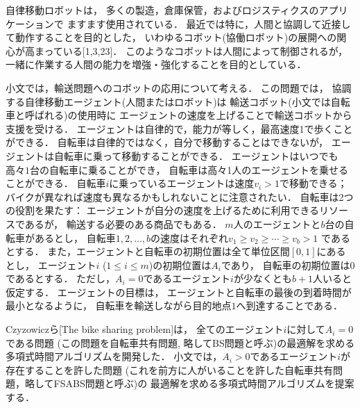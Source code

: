
自律移動ロボットは，
多くの製造，倉庫保管，およびロジスティクスのアプリケーションで
ますます使用されている．
最近では特に，人間と協調して近接して動作することを目的とした，
いわゆるコボット(協働ロボット)の展開への関心が高まっている[1,3,23]．
このようなコボットは人間によって制御されるが，
一緒に作業する人間の能力を増強・強化することを目的としている．

小文では，輸送問題へのコボットの応用について考える．
この問題では，
協調する自律移動エージェント(人間またはロボット)は
輸送コボット(小文では自転車と呼ばれる)の使用時に
エージェントの速度を上げることで輸送コボットから支援を受ける．
エージェントは自律的で，能力が等しく，最高速度1で歩くことができる．
自転車は自律的ではなく，自分で移動することはできないが，
エージェントは自転車に乗って移動することができる．
エージェントはいつでも高々$1$台の自転車に乗ることができ，
自転車は高々1人のエージェントを乗せることができる．
自転車$i$に乗っているエージェントは速度$v_i>1$で移動できる；
バイクが異なれば速度も異なるかもしれないことに注意されたい．
自転車は2つの役割を果たす：
エージェントが自分の速度を上げるために利用できるリソースであるが，
輸送する必要のある商品でもある．
$m$人のエージェントと$b$台の自転車があるとし，
自転車$1,2,\ldots,b$の速度はそれぞれ$v_1\ge v_2\ge\cdots\ge v_b>1$
であるとする．
また，エージェントと自転車の初期位置は全て単位区間$[0,1]$にあるとし，
エージェント$i$ ($1\le i\le m$)の初期位置は$A_i$であり，
自転車の初期位置は$0$であるとする．
ただし，$A_i=0$であるエージェント$i$が少なくとも$b+1$人いると仮定する．
エージェントの目標は，
エージェントと自転車の最後の到着時間が最小となるように，
自転車を輸送しながら目的地点$1$へ到達することである．

Czyzowiczら[The bike sharing problem]は，
全てのエージェント$i$に対して$A_i=0$である問題
(この問題を自転車共有問題, 略してBS問題と呼ぶ)の最適解を求める
多項式時間アルゴリズムを開発した．
小文では，$A_i>0$であるエージェント$i$が存在することを許した問題
(これを前方に人がいることを許した自転車共有問題，略してFSABS問題と呼ぶ)の
最適解を求める多項式時間アルゴリズムを提案する．

